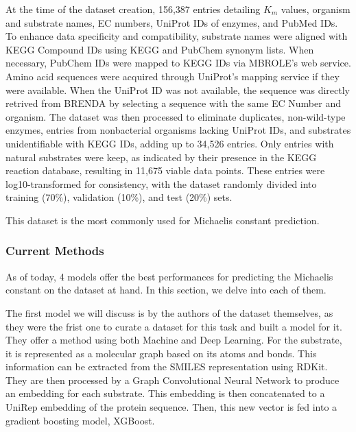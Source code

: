At the time of the dataset creation, 156,387 entries detailing $K_m$ values, organism and substrate names, 
EC numbers, UniProt IDs of enzymes, and PubMed IDs. To enhance data specificity and compatibility, 
substrate names were aligned with KEGG Compound IDs using KEGG and PubChem synonym lists. \cite{kegg}
When necessary, PubChem IDs were mapped to KEGG IDs via MBROLE's web service. \cite{pubchem,mbrole}
Amino acid sequences were acquired through UniProt's mapping service if they were available. \cite{uniprot}
When the UniProt ID was not available, the sequence was directly retrived from BRENDA by selecting a
sequence with the same EC Number and organism. The dataset was then processed to eliminate duplicates, 
non-wild-type enzymes, 
entries from nonbacterial organisms lacking UniProt IDs, and substrates unidentifiable with KEGG IDs, 
adding up to 34,526 entries. Only entries with natural substrates were keep, 
as indicated by their presence in the KEGG reaction database, resulting in 11,675 viable data points. 
These entries were log10-transformed for consistency, with the dataset randomly divided into training 
(70\%), validation (10\%), and test (20\%) sets. 

This dataset is the most commonly used for Michaelis constant prediction. 

\subsubsection{Current Methods}

As of today, 4 models offer the best performances for predicting the Michaelis constant on the dataset
at hand. In this section, we delve into each of them.

The first model we will discuss is by the authors of the dataset themselves, \citeauthor{km1} as they were
the frist one to curate a dataset for this task and built a model for it. They offer a method using both
Machine and Deep Learning. For the substrate, it is represented as a molecular graph based on its atoms and
bonds. This information can be extracted from the SMILES representation using RDKit. \cite{rdkit} They are
then processed by a Graph Convolutional Neural Network to produce an embedding for each substrate. This 
embedding is then concatenated to a UniRep embedding of the protein sequence. \cite{unirep} 
Then, this new vector is fed into a gradient boosting model, XGBoost. \cite{xgboost}

